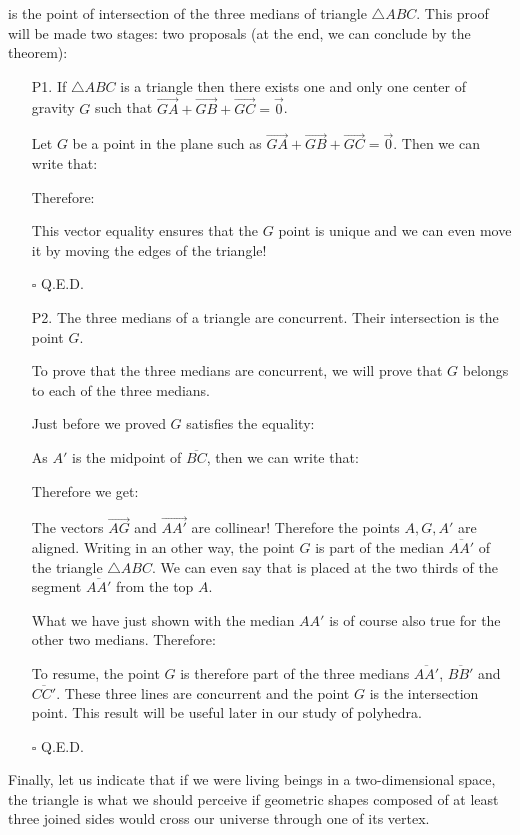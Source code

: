 {\begin{theorem}
	is the point of intersection of the three medians of triangle $\triangle ABC$. This proof will be made two stages: two proposals (at the end, we can conclude by the theorem):
	\begin{enumerate}
		\item[P1.] If $\triangle ABC$ is a triangle then there exists one and only one center of gravity $G$ such that $\overrightarrow{GA}+\overrightarrow{GB}+\overrightarrow{GC}=\vec{0}$.
		\begin{dem}
		Let $G$ be a point in the plane such as $\overrightarrow{GA}+\overrightarrow{GB}+\overrightarrow{GC}=\vec{0}$. Then we can write that:
		
		Therefore:
		
		This vector equality ensures that the $G$ point is unique and we can even move it by moving the edges of the triangle!
		\begin{flushright}
			$\square$  Q.E.D.
		\end{flushright}
		\end{dem}
		\item[P2.] The three medians of a triangle are concurrent. Their intersection is the point $G$.
		\begin{dem}
		To prove that the three medians are concurrent, we will prove that $G$ belongs to each of the three medians.
		
		Just before we proved $G$ satisfies the equality:
		
		As $A'$ is the midpoint of $\overline{BC}$, then we can write that:
		
		Therefore we get:
		
		The vectors $\overrightarrow{AG}$ and $\overrightarrow{AA'}$ are collinear! Therefore the points $A, G, A'$ are aligned. Writing in an other way, the point $G$ is part of the median $\overline{AA'}$ of the triangle $\triangle ABC$. We can even say that is placed at the two thirds of the segment $\overline{AA'}$ from the top $A$.
		
		What we have just shown with the median $AA'$ is of course also true for the other two medians. Therefore:
		
		To resume, the point $G$ is therefore part of the three medians $\overline{AA'}$, $\overline{BB'}$ and $\overline{CC'}$. These three lines are concurrent and the point $G$ is the intersection point. This result will be useful later in our study of polyhedra.
		\begin{flushright}
			$\square$  Q.E.D.
		\end{flushright}
		\end{dem}
	\end{enumerate}
	\end{theorem}
	Finally, let us indicate that if we were living beings in a two-dimensional space, the triangle is what we should perceive if geometric shapes composed of at least three joined sides would cross our universe through one of its vertex.
	
}
